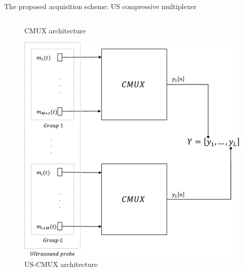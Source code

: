 {\begin{block}{The proposed acquisition scheme: US compressive multiplexer}
\begin{column}{.43\textwidth}
\begin{figure}[htb]
			\caption{CMUX architecture}
			\label{fig_CMUX}
		\end{figure}
	\begin{figure}[htb]
		\includegraphics[width=0.8\linewidth]{figures/USCMUX.pdf}
		\caption{US-CMUX architecture}
		\label{fig_USCMUX}
	\end{figure}
	\end{column}
	
\end{block}
\vfill

}
